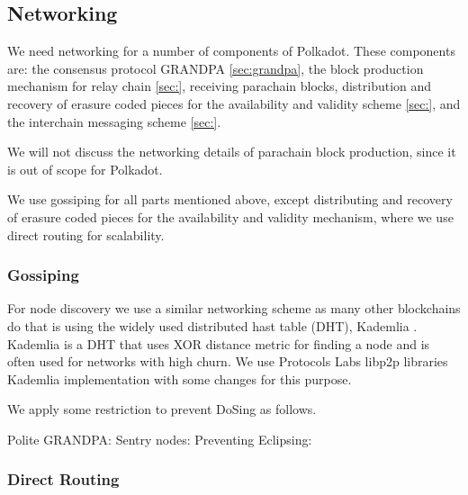 \subsection{Networking}

We need networking for a number of components of Polkadot.
These components are: the consensus protocol GRANDPA \ref{sec:grandpa},
the block production mechanism for relay chain \ref{sec:},
receiving parachain blocks,
distribution and recovery of erasure coded pieces for the availability and validity scheme \ref{sec:}, and
the interchain messaging scheme \ref{sec:}.

We will not discuss the networking details of parachain block production, since it is out of scope for Polkadot.

We use gossiping for all parts mentioned above, except distributing and recovery of erasure coded pieces for the availability and validity mechanism, where we use direct routing for scalability.

\subsubsection{Gossiping}
For node discovery we use a similar networking scheme as many other blockchains do that is using the widely used distributed hast table (DHT), Kademlia \cite{}.
Kademlia is a DHT that uses XOR distance metric for finding a node and is often used for networks with high churn.
We use Protocols Labs libp2p libraries \cite{} Kademlia implementation with some changes for this purpose.

We apply some restriction to prevent DoSing as follows.

Polite GRANDPA:
Sentry nodes:
Preventing Eclipsing:

\subsubsection{Direct Routing}
